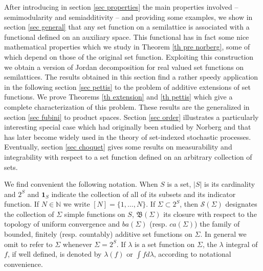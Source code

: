 \documentclass[11pt]{amsart}
\theoremstyle{plain}
\begin{document}
After introducing in section \ref{sec properties} the main properties involved -- 
semimodularity and semiadditivity -- and providing some examples, we show
in section \ref{sec general} that any set function on a semilattice is associated with 
a functional defined on an auxiliary space. This functional has in fact some nice
mathematical properties which we study in Theorem \ref{th pre norberg}, some
of which depend on those of the original set function. Exploiting this construction
we obtain a version of Jordan decomposition for real valued set functions on 
semilattices. The results obtained in this section find a rather speedy application 
in the following section \ref{sec pettis} to the problem of additive extensions of
set functions. We prove Theorems \ref{th extension} and \ref{th pettis} which give 
a complete characterization of this problem. These results are the generalized in 
section \ref{sec fubini} to product spaces. Section \ref{sec order} illustrates a particularly 
interesting special case which had originally been studied by Norberg and that has 
later become widely used in the theory of set-indexed stochastic processes. Eventually, 
section \ref{sec choquet} gives some results on measurability and integrability with 
respect to a set function defined on an arbitrary collection of sets.

We find convenient the following notation. When $S$ is a set, ${\vert S\vert}$ is its cardinality
and $2^S$ and ${\mathbf{1}_{S}}$ indicate the collection of all of its subsets and its indicator function. 
If $N\in{\mathbb{N}}$ we write $[N]=\{1,\ldots,N\}$. If $\Sigma\subset2^S$, then ${\mathscr{S}}(\Sigma)$ 
designates the collection of $\Sigma$ simple functions on $S$, ${\mathfrak{B}}(\Sigma)$ its closure 
with respect to the topology of uniform convergence and $ba(\Sigma)$ (resp. $ca(\Sigma)$) 
the family of bounded, finitely (resp. countably) additive set functions on $\Sigma$. In general 
we omit to refer to $\Sigma$ whenever $\Sigma=2^S$. If $\lambda$ is a set function on 
$\Sigma$, the $\lambda$ integral of $f$, if well defined, is denoted by $\lambda(f)$ or 
$\int fd\lambda$, according to notational convenience.
\end{document}
